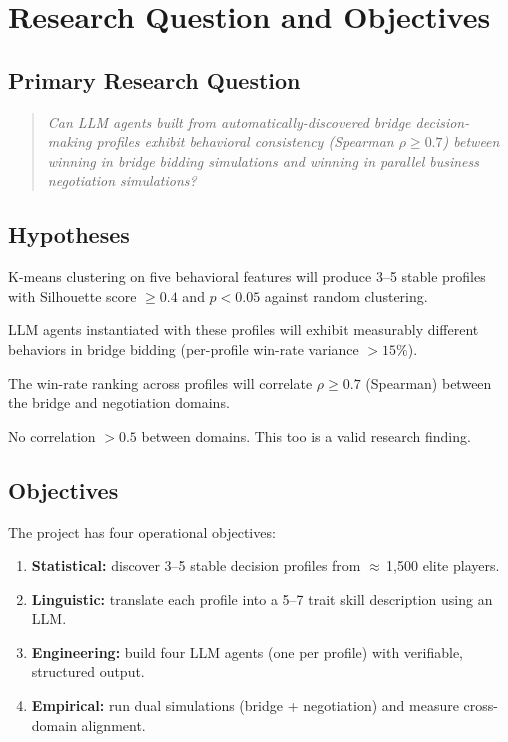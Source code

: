 \documentclass[11pt, a4paper, oneside, openany]{report}
\begin{document}
\chapter{Research Question and Objectives}
\label{ch:rq}

\section{Primary Research Question}

\begin{quote}
\itshape Can LLM agents built from automatically-discovered bridge decision-making profiles exhibit behavioral consistency (\emph{Spearman} $\rho \geq 0.7$) between winning in bridge bidding simulations and winning in parallel business negotiation simulations?
\end{quote}

\section{Hypotheses}

\begin{description}[leftmargin=2cm]
    \item[H1 -- Statistical:] K-means clustering on five behavioral features will produce 3--5 stable profiles with Silhouette score $\geq 0.4$ and $p < 0.05$ against random clustering.
    \item[H2 -- Behavioral:] LLM agents instantiated with these profiles will exhibit measurably different behaviors in bridge bidding (per-profile win-rate variance $> 15\%$).
    \item[H3 -- Transfer (main):] The win-rate ranking across profiles will correlate $\rho \geq 0.7$ (Spearman) between the bridge and negotiation domains.
    \item[Null:] No correlation $> 0.5$ between domains. This too is a valid research finding.
\end{description}

\section{Objectives}

The project has four operational objectives:

\begin{enumerate}[leftmargin=*]
    \item \textbf{Statistical:} discover 3--5 stable decision profiles from $\approx$\,1{,}500 elite players.
    \item \textbf{Linguistic:} translate each profile into a 5--7 trait skill description using an LLM.
    \item \textbf{Engineering:} build four LLM agents (one per profile) with verifiable, structured output.
    \item \textbf{Empirical:} run dual simulations (bridge + negotiation) and measure cross-domain alignment.
\end{enumerate}
\end{document}
